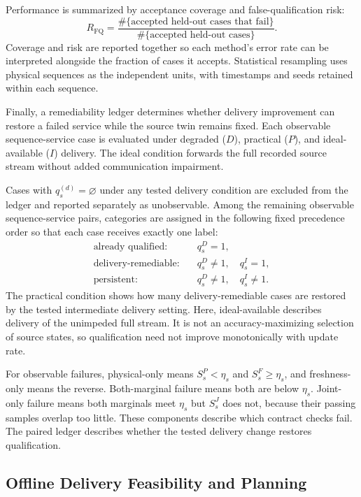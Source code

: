 \documentclass[journal]{IEEEtran}
\newcommand{\rev}[1]{#1}
\begin{document}
Performance is summarized by acceptance coverage and false-qualification risk:
\begin{equation}
R_{\mathrm{FQ}}
=
\frac{
\#\{\text{accepted held-out cases that fail}\}
}{
\#\{\text{accepted held-out cases}\}
}.
\end{equation}
Coverage and risk are reported together so each method's error rate can be interpreted alongside the fraction of cases it accepts. Statistical resampling uses physical sequences as the independent units, with timestamps and seeds retained within each sequence.

Finally, a remediability ledger determines whether delivery improvement can restore a failed service while the source twin remains fixed. Each observable sequence-service case is evaluated under degraded ($D$), practical ($P$), and ideal-available ($I$) delivery. The ideal condition forwards the full recorded source stream without added communication impairment.

Cases with $q_s^{(d)}=\varnothing$ under any tested delivery condition are excluded from the ledger and reported separately as unobservable. Among the remaining observable sequence-service pairs, categories are assigned in the following fixed precedence order so that each case receives exactly one label:
\begin{align}
\text{already qualified:}\quad
&q_s^{D}=1,\\
\text{delivery-remediable:}\quad
&q_s^{D}\neq 1,\quad q_s^{I}=1,\\
\text{persistent:}\quad
&q_s^{D}\neq 1,\quad q_s^{I}\neq 1.
\end{align}
The practical condition shows how many delivery-remediable cases are restored by the tested intermediate delivery setting.
\rev{Here, ideal-available describes delivery of the unimpeded full
stream. It is not an accuracy-maximizing selection of source states, so
qualification need not improve monotonically with update rate.}

\rev{For observable failures, physical-only means $S_s^P<\eta_s$ and
$S_s^F\geq\eta_s$, and freshness-only means the reverse. Both-marginal
failure means both are below $\eta_s$. Joint-only failure means both
marginals meet $\eta_s$ but $S_s^J$ does not, because their passing
samples overlap too little. These components describe which contract
checks fail. The paired ledger describes whether the tested delivery
change restores qualification.}
\subsection{\rev{Offline Delivery Feasibility and Planning}}
\label{subsec:offline_planning_method}
\end{document}
